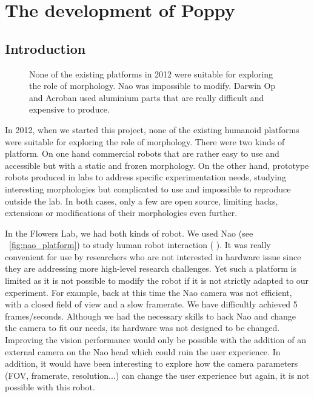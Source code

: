 \newpage
\mbox{}
\cleartoleftpage

\chapter{The development of Poppy} %
\label{cha:poppy-dev}

\section{Introduction} %

\begin{figure}[tb]
\centering
    \hfil
    \hfil
    \caption{None of the existing platforms in 2012 were suitable for exploring the role of morphology. Nao was impossible to modify. Darwin Op and Acroban used aluminium parts that are really difficult and expensive to produce.}
    \label{fig:2012_Humanoids}
\end{figure}

In 2012, when we started this project, none of the existing humanoid platforms were suitable for exploring the role of morphology. There were two kinds of platform. On one hand commercial robots that are rather easy to use and accessible but with a static and frozen morphology. On the other hand, prototype robots produced in labs to address specific experimentation needs, studying interesting morphologies but complicated to use and impossible to reproduce outside the lab. In both cases, only a few are open source, limiting hacks, extensions or modifications of their morphologies even further.

In the Flowers Lab, we had both kinds of robot. We used Nao (see \figurename~\ref{fig:nao_platform}) to study human robot interaction (\cite{rouanet2009integrated} \cite{rouanet2012apprendre}). It was really convenient for use by researchers who are not interested in hardware issue since they are addressing more high-level research challenges. Yet such a platform is limited as it is not possible to modify the robot if it is not strictly adapted to our experiment. For example, back at this time the Nao camera was not efficient, with a closed field of view and a slow framerate. We have difficultly achieved 5 frames/seconds. Although we had the necessary skills to hack Nao and change the camera to fit our needs, its hardware was not designed to be changed. Improving the vision performance would only be possible with the addition of an external camera on the Nao head which could ruin the user experience. In addition, it would have been interesting to explore how the camera parameters (FOV, framerate, resolution...) can change the user experience but again, it is not possible with this robot.


